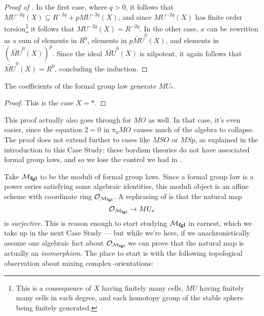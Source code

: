 \begin{proof}[{Proof of }]
In the first case, where $q > 0$, it follows that $MU^{-2q}(X) \subseteq R^{-2q} + pMU^{-2q}(X)$, and since $MU^{-2q}(X)$ has finite order torsion\footnote{This is a consequence of $X$ having finitely many cells, $MU$ having finitely many cells in each degree, and each homotopy group of the stable sphere being finitely generated.} it follows that $MU^{-2q}(X) = R^{-2q}$.  In the other case, $x$ can be rewritten as a sum of elements in $R^{0}$, elements in $p \widetilde{MU}^{0}(X)$, and elements in $(\widetilde{MU}^0(X))^p$.  Since the ideal $\widetilde{MU}^0(X)$ is nilpotent, it again follows that $\widetilde{MU}^0(X) = R^0$, concluding the induction.
\end{proof}

\begin{corollary}\label{QuillenSurjective}
The coefficients of the formal group law generate $MU_*$.
\end{corollary}
\begin{proof}
This is the case $X = *$.
\end{proof}

\begin{remark}
This proof actually also goes through for $MO$ as well.  In that case, it's even easier, since the equation $2 = 0$ in $\pi_0 MO$ causes much of the algebra to collapse.  The proof does not extend further to cases like $MSO$ or $MSp$, as explained in the introduction to this Case Study: these bordism theories do not have associated formal group laws, and so we lose the control we had in .
\end{remark}

Take $\mathcal{M}_{\mathbf{fgl}}$ to be the moduli of formal group laws.  Since a formal group law is a power series satisfying some algebraic identities, this moduli object is an affine scheme with coordinate ring $\mathcal{O}_{\mathcal{M}_{\mathbf{fgl}}}$.  A rephrasing of  is that the natural map \[\mathcal{O}_{\mathcal{M}_{\mathbf{fgl}}} \to MU_*\] is \emph{surjective}.  This is reason enough to start studying $\mathcal{M}_{\mathbf{fgl}}$ in earnest, which we take up in the next Case Study --- but while we're here, if we anachronistically assume one algebraic fact about $\mathcal{O}_{\mathcal{M}_{\mathbf{fgl}}}$ we can prove that the natural map is actually an \emph{isomorphism}.  The place to start is with the following topological observation about mixing complex--orientations:


